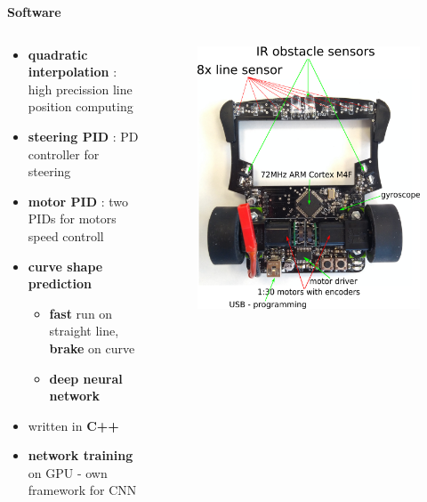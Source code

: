 \documentclass[xcolor=dvipsnames]{beamer}
\begin{document}
\begin{frame}{\bf Software}



\begin{columns}

    \begin{column}{0.5\textwidth}  %
    {\small
        \begin{itemize}
            \item {\bf quadratic interpolation}  : high precission line position computing
            \item {\bf steering PID}  : PD controller for steering
            \item {\bf motor PID}  : two PIDs for motors speed controll
            \item {\bf curve shape prediction}
                \begin{itemize}
                    \item {\bf fast} run on straight line, {\bf brake} on curve
                    \item {\color{red} \bf deep neural network}
                \end{itemize}
            \item written in {\bf C++}
            \item {\bf network training} on GPU - own framework for CNN
        \end{itemize}
    }
    \end{column}

    \begin{column}{0.5\textwidth}

        \begin{figure}
            \includegraphics[scale=0.3]{../../diagrams/motoko_uprising_hw.png}
        \end{figure}


\end{column}
\end{columns}
\end{frame}
\end{document}
